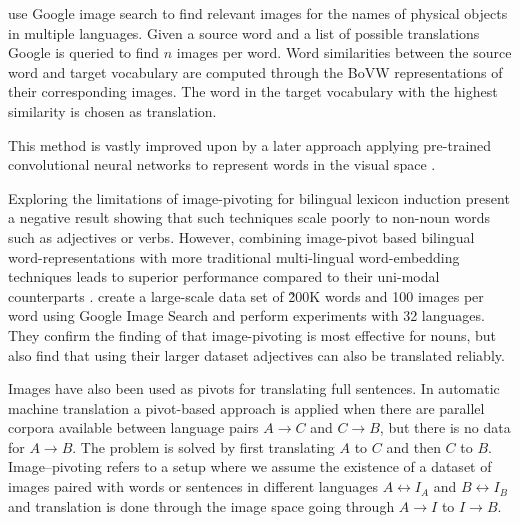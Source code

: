 \citep{bergsma2011learning} 
use Google image search to find
relevant images for the names of physical objects in multiple languages.
Given a source word and a list of possible translations
Google is queried to find $n$ images per word. Word similarities between the 
source word and target vocabulary are computed through the BoVW representations
of their corresponding images. The word in the target vocabulary with the highest
similarity is chosen as translation.

This method is vastly improved upon by a later approach applying
pre-trained convolutional neural networks to represent words
in the visual space  \cite{kiela2015visual} .

Exploring the limitations of image-pivoting for bilingual lexicon induction
\cite{hartmann2017limitations} present a negative result
showing that such techniques scale poorly to non-noun words such as
adjectives or verbs. However, combining image-pivot based bilingual
word-representations with more traditional multi-lingual word-embedding
techniques leads to superior performance compared to their uni-modal
counterparts \citep{vulic2016multi}. 
\cite{hewitt2018learning} create a large-scale data set
of \~200K words and 100 images per word using Google Image Search and perform
experiments with 32 languages.
They confirm the finding of \cite{hartmann2017limitations} that image-pivoting
is most effective for nouns, but also find that using their larger dataset
adjectives can also be translated reliably. 


Images have also been used as pivots for translating full sentences.
In automatic machine translation a pivot-based approach is applied
when there are parallel corpora available between language pairs $A\rightarrow C$
and $C \rightarrow B$, but there is no data for $A\rightarrow B$. The problem is
solved by first translating $A$ to $C$ and then $C$ to $B$.
Image--pivoting refers to a setup where we assume the existence of a dataset
of images paired with words or sentences in different languages $A \leftrightarrow I_A$ and
$B \leftrightarrow I_B$ and translation is done through the image space
going  through $A \rightarrow I$ to $I \rightarrow B$.

